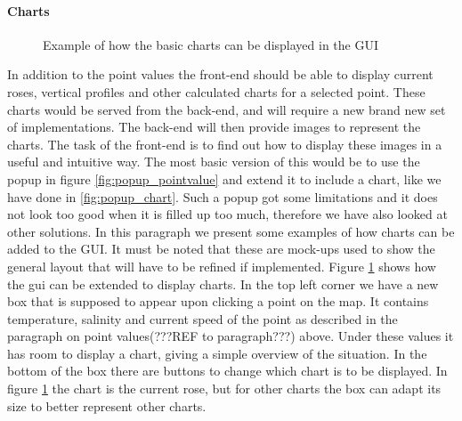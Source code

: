 \documentclass[11pt,a4paper,titlepage,oneside]{report}
\begin{document}
\paragraph{Charts}
\begin{figure}[!htb]
  \begin{center}
    \caption{Example of how the basic charts can be displayed in the GUI}
    \label{fig:gui_basicChart}
  \end{center}
\end{figure}
In addition to the point values the \gls{front-end} should be able to display current roses, vertical profiles and other calculated charts for a selected point. These charts would be served from the \gls{back-end}, and will require a new brand new set of implementations. The \gls{back-end} will then provide images to represent the charts. The task of the \gls{front-end} is to find out how to display these images in a useful and intuitive way. The most basic version of this would be to use the popup in figure \ref{fig:popup_pointvalue} and extend it to include a chart, like we have done in \ref{fig:popup_chart}. Such a popup got some limitations and it does not look too good when it is filled up too much, therefore we have also looked at other solutions. 
In this paragraph we present some examples of how charts can be added to the \gls{GUI}. It must be noted that these are mock-ups used to show the general layout that will have to be refined if implemented.
Figure \ref{fig:gui_basicChart} shows how the gui can be extended to display charts. In the top left corner we have a new box that is supposed to appear upon clicking a point on the map. It contains temperature, salinity and current speed of the point as described in the paragraph on point values(???REF to paragraph???) above. Under these values it has room to display a chart, giving a simple overview of the situation. In the bottom of the box there are buttons to change which chart is to be displayed. In figure \ref{fig:gui_basicChart} the chart is the current rose, but for other charts the box can adapt its size to better represent other charts.
\end{document}
